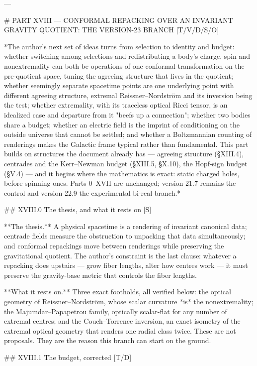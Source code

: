 ---

# PART XVIII — CONFORMAL REPACKING OVER AN INVARIANT GRAVITY QUOTIENT: THE VERSION-23 BRANCH [T/V/D/S/O]

*The author's next set of ideas turns from selection to identity and budget: whether switching among selections and redistributing a body's charge, spin and nonextremality can both be operations of one conformal transformation on the pre-quotient space, tuning the agreeing structure that lives in the quotient; whether seemingly separate spacetime points are one underlying point with different agreeing structure, extremal Reissner–Nordström and its inversion being the test; whether extremality, with its traceless optical Ricci tensor, is an idealized case and departure from it "beefs up a connection"; whether two bodies share a budget; whether an electric field is the imprint of conditioning on the outside universe that cannot be settled; and whether a Boltzmannian counting of renderings makes the Galactic frame typical rather than fundamental. This part builds on structures the document already has — agreeing structure (§XIII.4), centrades and the Kerr–Newman budget (§XIII.5, §X.10), the Hopf-sign budget (§V.4) — and it begins where the mathematics is exact: static charged holes, before spinning ones. Parts 0–XVII are unchanged; version 21.7 remains the control and version 22.9 the experimental bi-real branch.*

## XVIII.0 The thesis, and what it rests on [S]

**The thesis.** A physical spacetime is a rendering of invariant canonical data; centrade fields measure the obstruction to unpacking that data simultaneously; and conformal repackings move between renderings while preserving the gravitational quotient. The author's constraint is the last clause: whatever a repacking does upstairs — grow fiber lengths, alter how centres work — it must preserve the gravity-base metric that controls the fiber lengths.

**What it rests on.** Three exact footholds, all verified below: the optical geometry of Reissner–Nordström, whose scalar curvature *is* the nonextremality; the Majumdar–Papapetrou family, optically scalar-flat for any number of extremal centres; and the Couch–Torrence inversion, an exact isometry of the extremal optical geometry that renders one radial class twice. These are not proposals. They are the reason this branch can start on the ground.

## XVIII.1 The budget, corrected [T/D]

